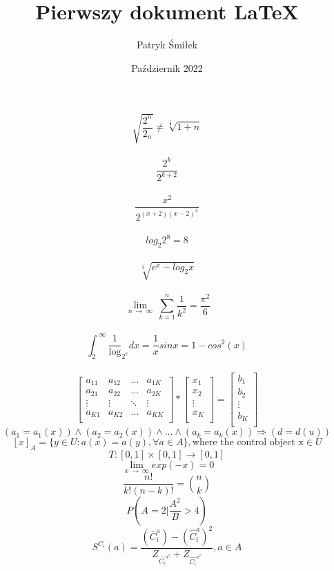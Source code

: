 \documentclass[12pt, letterpaper, titlepage]{article}
\title{Pierwszy dokument LaTeX}
\author{Patryk Śmiłek}
\date{Październik 2022}
\begin{document}
\maketitle
$$ \sqrt{ \frac{2^{n}} {2_n}} \neq \sqrt[\frac{1}{3}]{1+n} $$ \\
$$ \frac{2^{k}}{2^{k+2}} $$ \\
$$ \frac{x^{2}}{2^{(x+2)(x-2)^3}} $$ \\
$$ log_{2} 2^{8} = 8 $$ \\
$$ \sqrt  [3]{e^{x}- log_{2}x}$$ \\
$$ \ \lim_{n \ \rightarrow \ \infty} \ \sum_{k=1}^{n} \frac{1}{k^{2}} = \frac{\pi^{2}}{6} $$ \\
$$ \int^{\ \infty}_{2} \frac{1} \log_{2^{x}} dx= \frac{1}{x}sinx=1-cos^{2}(x) $$ \\
$$\mathbf{}
\left[ \begin{array}{cccc}
a_{11} & a_{12} & \ldots & a_{1K} \\
a_{21} & a_{22} & \ldots & a_{2K} \\
\vdots & \vdots & \ddots & \vdots \\
a_{K1} & a_{K2} & \ldots & a_{KK} \\
\end{array} \right] *
\left[ \begin{array}{c}
x_{1} \\
x_{2} \\
\vdots \\
x_{K} \\
\end{array} \right] =
\left[ \begin{array}{c}
b_{1} \\
b_{2} \\
\vdots \\
b_{K} \\
\end{array} \right]
$$
$$ (a_{1}=a_{1}(x)) \land (a_{2}=a_{2}(x)) \land ... \land (a_{k}=a_{k}(x))\Rightarrow (d=d(u))$$
$$ [x]_{A}= \{y \in U : a(x)=a(y), \forall a \in A\}, \text{where the control object x} \in U $$
$$ T:[0,1] \times [0,1] \rightarrow [0,1] $$
$$ \ \lim_{x \ \rightarrow \ \infty} exp(-x)=0 $$
$$ \frac{n!}{k!(n-k)!}= {n \choose k} $$
$$ P(A=2 | \frac{A^{2}}{B}>4) $$
$$ S^{C_i}(a)= \frac{(\bar{C}^{a}_i) - (\hat{C}^{a}_i)^{2}} {Z_{\bar{C_i}^{a^{2}}} + Z_{\hat{C_i}^{a^{2}}}}, a \in A $$
\end{document}
